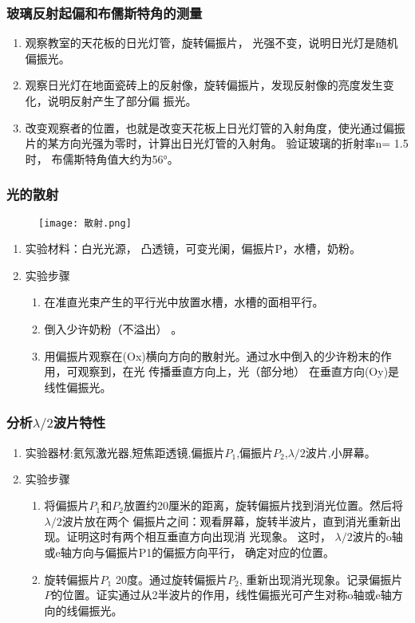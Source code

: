 \documentclass[dvipsnames, svgnames,a4paper,11pt]{article}
\begin{document}
	\subsubsection{玻璃反射起偏和布儒斯特角的测量}
	\begin{enumerate}
		\item 观察教室的天花板的日光灯管，旋转偏振片， 光强不变，说明日光灯是随机偏振光。
		\item 观察日光灯在地面瓷砖上的反射像，旋转偏振片，发现反射像的亮度发生变化，说明反射产生了部分偏
		振光。
		\item 改变观察者的位置，也就是改变天花板上日光灯管的入射角度，使光通过偏振片的某方向光强为零时，计算出日光灯管的入射角。 验证玻璃的折射率n= 1.5时， 布儒斯特角值大约为56°。
	\end{enumerate}
	\subsubsection{光的散射}
	\begin{figure}[{H}]
		\centering
		\texttt{[image: 散射.png]}
	
		\label{}
	\end{figure}
	\begin{enumerate}
		\item 实验材料：白光光源， 凸透镜，可变光阑，偏振片P，水槽，奶粉。
		\item 实验步骤
		\begin{enumerate}
			\item 在准直光束产生的平行光中放置水槽，水槽的面相平行。
			\item 倒入少许奶粉（不溢出） 。
			\item 用偏振片观察在(Ox)横向方向的散射光。通过水中倒入的少许粉末的作用，可观察到，在光
			传播垂直方向上，光（部分地） 在垂直方向(Oy)是线性偏振光。
		\end{enumerate}
	\end{enumerate}
	\subsubsection{分析$\lambda/2$波片特性}
\begin{enumerate}
	
	\item $\text{实验器材:氦氖激光器,短焦距透镜,偏振片$P_1$,偏振片$P_2$,}\lambda/2\text{波片,小屏幕。}$
	\item 实验步骤


	\begin{enumerate}
		\item  将偏振片$P_1$和$P_2$放置约20厘米的距离，旋转偏振片找到消光位置。然后将$\lambda/2$波片放在两个
		偏振片之间：观看屏幕，旋转半波片，直到消光重新出现。证明这时有两个相互垂直方向出现消
		光现象。 这时， $\lambda/2$波片的o轴或e轴方向与偏振片P1的偏振方向平行， 确定对应的位置。
		\item 旋转偏振片$P_{1}$ 20度。通过旋转偏振片$P_{2}$, 重新出现消光现象。记录偏振片$P$的位置。证实通过从2半波片的作用，线性偏振光可产生对称o轴或e轴方向的线偏振光。
	\end{enumerate}




\end{enumerate}
\end{document}
